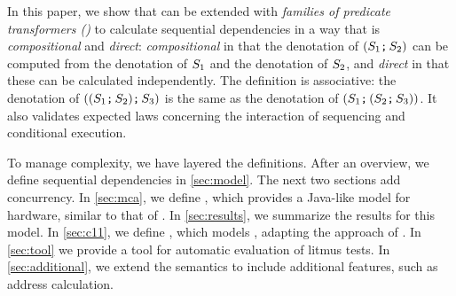 In this paper, we show that \PwP{} can be extended with \emph{families of
  predicate transformers (\PwT{})} to calculate sequential dependencies in a way that
is \emph{compositional} and \emph{direct}: \emph{compositional} in that the
denotation of $(S_1\texttt{;}\,\allowbreak S_2)$ can be computed from the denotation of
$S_1$ and the denotation of $S_2$, and \emph{direct} in that these
can be calculated independently.  The definition is associative: the
denotation of $((S_1\texttt{;}\,\allowbreak S_2)\texttt{;}\,\allowbreak S_3)$ is the same as the
denotation of $(S_1\texttt{;}\,\allowbreak (S_2\texttt{;}\,\allowbreak S_3))$.  It also validates
expected laws concerning the interaction of sequencing and conditional
execution.

To manage complexity, we have layered the definitions.  After an overview, we
define sequential dependencies in \textsection\ref{sec:model}.  The next two
sections add concurrency.  In \textsection\ref{sec:mca}, we define \PwTmca{},
which provides a Java-like model for \mca{} hardware, similar to that of
\citet{DBLP:journals/pacmpl/JagadeesanJR20}.  In
\textsection\ref{sec:results}, we summarize the results for this model. In \textsection\ref{sec:c11},
we define \PwTc{}, which models \cXI, adapting the approach of
\citet{DBLP:conf/esop/PaviottiCPWOB20}.  In \textsection\ref{sec:tool} we 
provide a tool for automatic evaluation of litmus tests.  In \textsection\ref{sec:additional},
we extend the semantics to include additional features, such as address
calculation.  



